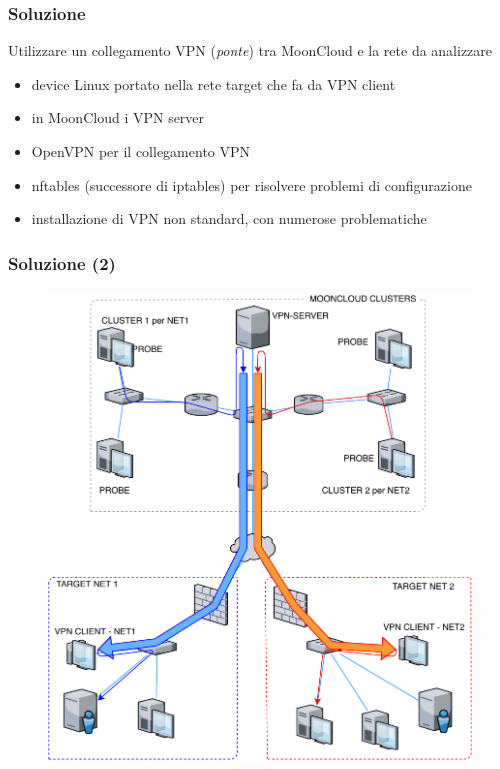 \begin{frame}
	\frametitle{Soluzione}
	Utilizzare un collegamento \alert{VPN} (\textit{ponte}) tra MoonCloud e
	la rete da analizzare
	    
	\begin{itemize}
		\item device \alert{Linux} portato nella rete target che fa da VPN client
		\item in MoonCloud i \alert{VPN server}
		\item \alert{OpenVPN} per il collegamento VPN 
		\item \alert{nftables} (successore
		      di \alert{iptables}) per risolvere problemi di configurazione
		      		      
	\end{itemize}
	    
	\begin{itemize}
		\item installazione di \alert{VPN non standard}, con numerose problematiche 
	\end{itemize}
\end{frame}

\begin{frame}
    \frametitle{Soluzione (2)}
    \begin{figure}
        \includegraphics[scale=0.45]{img/ls}
    \end{figure}
\end{frame}


